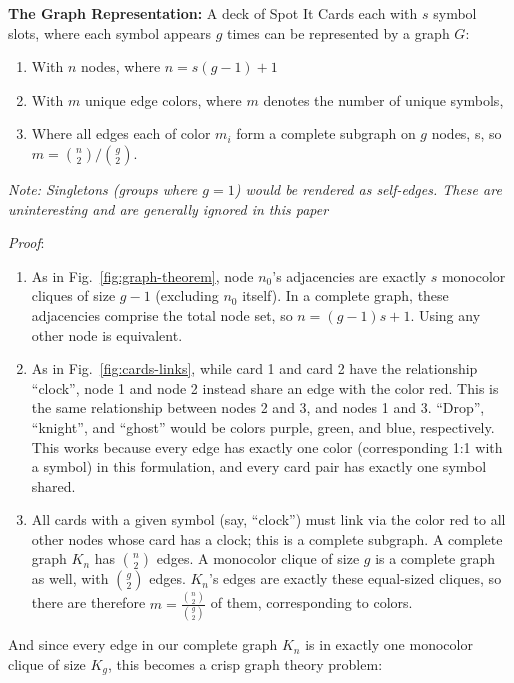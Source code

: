 \documentclass[11pt, oneside]{article} 	%
\begin{document}
\begin{framed}
\textbf{The Graph Representation:} A deck of Spot It Cards each with $s$ symbol slots, where each symbol appears $g$ times can be represented by a graph $G$:
\begin{enumerate}
\item With $n$ nodes, where $n = s(g-1) + 1$
\item With $m$ unique edge colors, where $m$ denotes the number of unique symbols,
\item Where all edges each of color $m_i$ form a complete subgraph on $g$ nodes, s, so $m = {n \choose 2} / {g \choose 2}$.
\end{enumerate}
\end{framed}

\emph{Note: Singletons (groups where $g=1$) would be rendered as self-edges. These are uninteresting and are generally ignored in this paper}

\emph{Proof}:
\begin{enumerate}
\item As in Fig.~\ref{fig:graph-theorem}, node $n_0$'s adjacencies are exactly $s$ monocolor cliques of size $g-1$ (excluding $n_0$ itself). In a complete graph, these adjacencies comprise the total node set, so $n = (g-1)s + 1$. Using any other node is equivalent.
\item As in Fig.~\ref{fig:cards-links}, while card 1 and card 2 have the relationship ``clock'', node 1 and node 2 instead share an edge with the color red. This is the same relationship between nodes 2 and 3, and nodes 1 and 3. ``Drop'', ``knight'', and ``ghost'' would be colors purple, green, and blue, respectively. This works because every edge has exactly one color (corresponding 1:1 with a symbol) in this formulation, and every card pair has exactly one symbol shared.
\item All cards with a given symbol (say, ``clock'') must link via the color red to all other nodes whose card has a clock; this is a complete subgraph. A complete graph $K_n$ has ${n \choose 2}$ edges. A monocolor clique of size $g$ is a complete graph as well, with ${g \choose 2}$ edges. $K_n$'s edges are exactly these equal-sized cliques, so there are therefore $m = \frac{{n \choose 2}}{{g \choose 2}}$ of them, corresponding to colors.
\end{enumerate}

And since every edge in our complete graph $K_n$ is in exactly one monocolor clique of size $K_g$, this becomes a crisp graph theory problem:
\end{document}
